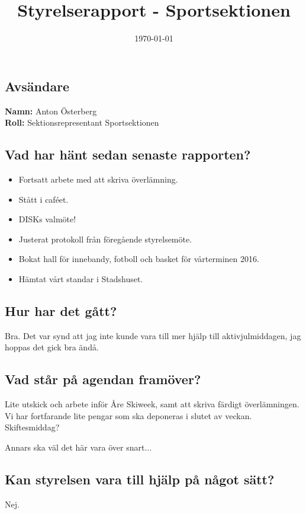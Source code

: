 \documentclass[a4paper]{article}
\begin{document}
	\title{Styrelserapport - Sportsektionen}
	\date{\today}
	\maketitle

	\subsection{Avsändare}
		\textbf{Namn:} Anton Österberg\\
		\textbf{Roll:} Sektionsrepresentant Sportsektionen\\
	\subsection{Vad har hänt sedan senaste rapporten?}
	\begin{itemize}
		\item Fortsatt arbete med att skriva överlämning.
		\item Stått i caféet.
		\item DISKs valmöte!
		\item Justerat protokoll från föregående styrelsemöte.
		\item Bokat hall för innebandy, fotboll och basket för vårterminen 2016.
		\item Hämtat vårt standar i Stadshuset.
	\end{itemize}
	\subsection{Hur har det gått?}
	Bra. Det var synd att jag inte kunde vara till mer hjälp till aktivjulmiddagen, jag hoppas det gick bra ändå.

	\subsection{Vad står på agendan framöver?}
	Lite utskick och arbete inför Åre Skiweek, samt att skriva färdigt överlämningen. Vi har fortfarande lite pengar som ska deponeras i slutet av veckan. Skiftesmiddag?

	Annars ska väl det här vara över snart...

	\subsection{Kan styrelsen vara till hjälp på något sätt?}
	Nej.
\end{document}
